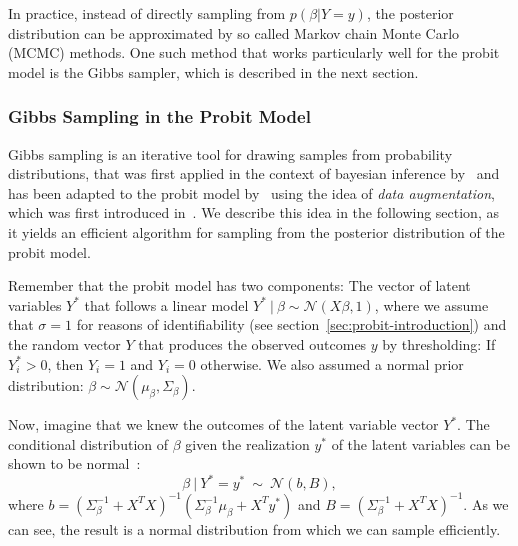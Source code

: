 In practice, instead of directly sampling from $p(\beta | Y=y)$,
the posterior distribution can be approximated by so called
Markov chain Monte Carlo (MCMC) methods.
One such method that works particularly well for the probit model
is the Gibbs sampler, which is described in the next section.

\subsubsection{Gibbs Sampling in the Probit Model}

Gibbs sampling is an iterative tool for drawing samples from
probability distributions, that was first applied in the
context of bayesian
inference by~\cite{gibbs-sampler} and has been adapted to the
probit model by~\cite{gibbs-probit-albert-chib} using the idea
of \textit{data augmentation}, which was first introduced
in~\cite{data-augmentation}.
We describe this idea in the following section, as it yields
an efficient algorithm for sampling from the posterior
distribution of the probit model.

Remember that the probit model has two components: The vector of latent
variables $Y^\ast$ that follows a linear model
$Y^\ast\ |\ \beta\sim \mathcal{N}(X \beta, 1)$, where we assume that $\sigma=1$
for reasons of identifiability (see section~\ref{sec:probit-introduction})
and the random vector $Y$ that produces the observed outcomes $y$ by
thresholding: If $Y_i^\ast > 0$, then $Y_i=1$ and $Y_i=0$ otherwise.
We also assumed a normal prior distribution:
$\beta \sim \mathcal{N}(\mu_\beta, \Sigma_\beta)$.

Now, imagine that we knew the outcomes of the latent variable vector $Y^\ast$.
The conditional distribution of $\beta$ given the realization $y^\ast$
of the latent variables can be shown to be normal~\cite{gibbs-probit-albert-chib}:
\begin{equation}
    \label{eq:gibbs-normal}
    \beta\ |\ Y^\ast = y^\ast\ \sim\ \mathcal{N}(b, B),
\end{equation}
where
$b = (\Sigma_\beta^{-1} + X^TX)^{-1}(\Sigma_\beta^{-1} \mu_\beta + X^T y^\ast)$
and
$B = (\Sigma_\beta^{-1} + X^TX)^{-1}$.
As we can see, the result is a normal distribution from which we can
sample efficiently.

